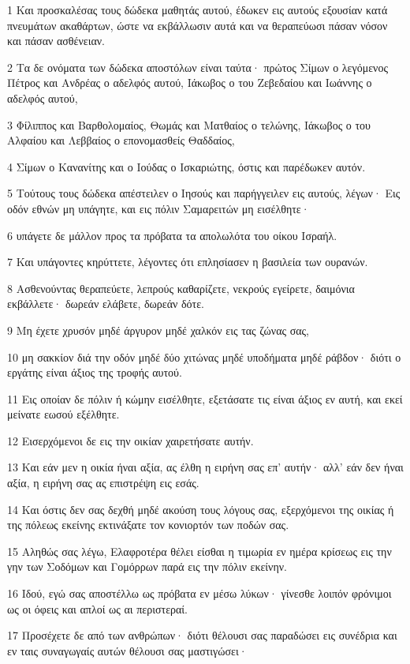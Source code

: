 \par 1 Και προσκαλέσας τους δώδεκα μαθητάς αυτού, έδωκεν εις αυτούς εξουσίαν κατά πνευμάτων ακαθάρτων, ώστε να εκβάλλωσιν αυτά και να θεραπεύωσι πάσαν νόσον και πάσαν ασθένειαν.
\par 2 Τα δε ονόματα των δώδεκα αποστόλων είναι ταύτα· πρώτος Σίμων ο λεγόμενος Πέτρος και Ανδρέας ο αδελφός αυτού, Ιάκωβος ο του Ζεβεδαίου και Ιωάννης ο αδελφός αυτού,
\par 3 Φίλιππος και Βαρθολομαίος, Θωμάς και Ματθαίος ο τελώνης, Ιάκωβος ο του Αλφαίου και Λεββαίος ο επονομασθείς Θαδδαίος,
\par 4 Σίμων ο Κανανίτης και ο Ιούδας ο Ισκαριώτης, όστις και παρέδωκεν αυτόν.
\par 5 Τούτους τους δώδεκα απέστειλεν ο Ιησούς και παρήγγειλεν εις αυτούς, λέγων· Εις οδόν εθνών μη υπάγητε, και εις πόλιν Σαμαρειτών μη εισέλθητε·
\par 6 υπάγετε δε μάλλον προς τα πρόβατα τα απολωλότα του οίκου Ισραήλ.
\par 7 Και υπάγοντες κηρύττετε, λέγοντες ότι επλησίασεν η βασιλεία των ουρανών.
\par 8 Ασθενούντας θεραπεύετε, λεπρούς καθαρίζετε, νεκρούς εγείρετε, δαιμόνια εκβάλλετε· δωρεάν ελάβετε, δωρεάν δότε.
\par 9 Μη έχετε χρυσόν μηδέ άργυρον μηδέ χαλκόν εις τας ζώνας σας,
\par 10 μη σακκίον διά την οδόν μηδέ δύο χιτώνας μηδέ υποδήματα μηδέ ράβδον· διότι ο εργάτης είναι άξιος της τροφής αυτού.
\par 11 Εις οποίαν δε πόλιν ή κώμην εισέλθητε, εξετάσατε τις είναι άξιος εν αυτή, και εκεί μείνατε εωσού εξέλθητε.
\par 12 Εισερχόμενοι δε εις την οικίαν χαιρετήσατε αυτήν.
\par 13 Και εάν μεν η οικία ήναι αξία, ας έλθη η ειρήνη σας επ' αυτήν· αλλ' εάν δεν ήναι αξία, η ειρήνη σας ας επιστρέψη εις εσάς.
\par 14 Και όστις δεν σας δεχθή μηδέ ακούση τους λόγους σας, εξερχόμενοι της οικίας ή της πόλεως εκείνης εκτινάξατε τον κονιορτόν των ποδών σας.
\par 15 Αληθώς σας λέγω, Ελαφροτέρα θέλει είσθαι η τιμωρία εν ημέρα κρίσεως εις την γην των Σοδόμων και Γομόρρων παρά εις την πόλιν εκείνην.
\par 16 Ιδού, εγώ σας αποστέλλω ως πρόβατα εν μέσω λύκων· γίνεσθε λοιπόν φρόνιμοι ως οι όφεις και απλοί ως αι περιστεραί.
\par 17 Προσέχετε δε από των ανθρώπων· διότι θέλουσι σας παραδώσει εις συνέδρια και εν ταις συναγωγαίς αυτών θέλουσι σας μαστιγώσει·
